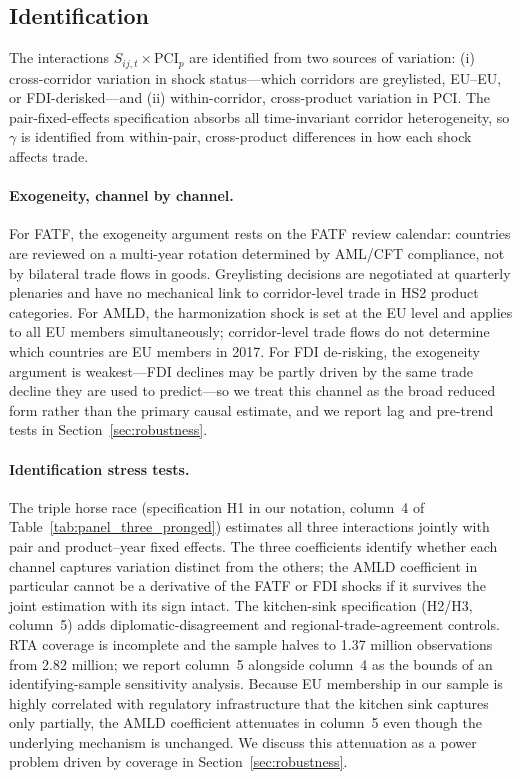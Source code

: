 \subsection{Identification}

The interactions $S_{ij,t} \times \text{PCI}_p$ are identified from two sources of variation: (i) cross-corridor variation in shock status---which corridors are greylisted, EU--EU, or FDI-derisked---and (ii) within-corridor, cross-product variation in PCI. The pair-fixed-effects specification absorbs all time-invariant corridor heterogeneity, so $\gamma$ is identified from within-pair, cross-product differences in how each shock affects trade.

\paragraph{Exogeneity, channel by channel.}
For FATF, the exogeneity argument rests on the FATF review calendar: countries are reviewed on a multi-year rotation determined by AML/CFT compliance, not by bilateral trade flows in goods. Greylisting decisions are negotiated at quarterly plenaries and have no mechanical link to corridor-level trade in HS2 product categories. For AMLD, the harmonization shock is set at the EU level and applies to all EU members simultaneously; corridor-level trade flows do not determine which countries are EU members in 2017. For FDI de-risking, the exogeneity argument is weakest---FDI declines may be partly driven by the same trade decline they are used to predict---so we treat this channel as the broad reduced form rather than the primary causal estimate, and we report lag and pre-trend tests in Section~\ref{sec:robustness}.

\paragraph{Identification stress tests.}
The triple horse race (specification H1 in our notation, column~4 of Table~\ref{tab:panel_three_pronged}) estimates all three interactions jointly with pair and product--year fixed effects. The three coefficients identify whether each channel captures variation distinct from the others; the AMLD coefficient in particular cannot be a derivative of the FATF or FDI shocks if it survives the joint estimation with its sign intact. The kitchen-sink specification (H2/H3, column~5) adds diplomatic-disagreement and regional-trade-agreement controls. RTA coverage is incomplete and the sample halves to 1.37 million observations from 2.82 million; we report column~5 alongside column~4 as the bounds of an identifying-sample sensitivity analysis. Because EU membership in our sample is highly correlated with regulatory infrastructure that the kitchen sink captures only partially, the AMLD coefficient attenuates in column~5 even though the underlying mechanism is unchanged. We discuss this attenuation as a power problem driven by coverage in Section~\ref{sec:robustness}.


